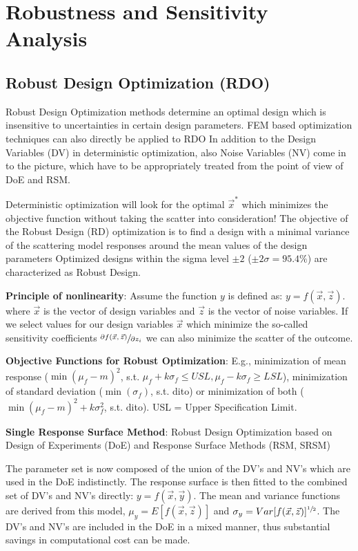 \section*{Robustness and Sensitivity Analysis}

\subsection*{Robust Design Optimization (RDO)}
Robust Design Optimization methods determine an optimal design which is insensitive to uncertainties in certain design parameters.
FEM based optimization techniques can also directly be applied to RDO
In addition to the Design Variables (DV) in deterministic optimization, also Noise Variables (NV) come in to the picture, which have to be appropriately treated from the point of view of DoE and RSM.

Deterministic optimization will look for the optimal $\vec{x}^*$ which minimizes the objective function without taking the scatter into consideration!
The objective of the Robust Design (RD) optimization is to find a design with a minimal variance of the scattering model responses around the mean values of the design parameters
Optimized designs within the sigma level $\pm 2$ ($\pm 2\sigma = 95.4\%$) are characterized as Robust Design.

\textbf{Principle of nonlinearity}:
Assume the function $y$ is defined as: $y=f(\vec{x}, \vec{z})$. where $\vec{x}$ is the vector of design variables and $\vec{z}$ is the vector of noise variables. 
If we select values for our design variables $\vec{x}$ which minimize the so-called sensitivity coefficients $\sfrac{\partial f(\vec{x}, \vec{z})}{\partial z_i}$ we can also minimize the scatter of the outcome.

\textbf{Objective Functions for Robust Optimization}:
E.g., minimization of mean response ($\min(\mu_f - m)^2$, s.t. $\mu_f + k\sigma_f \leq USL, \mu_f - k\sigma_f \geq LSL$), minimization of standard deviation ($\min(\sigma_f)$, s.t. dito) or minimization of both ($\min(\mu_f - m)^2 + k \sigma_f^2$, s.t. dito).
USL = Upper Specification Limit.


\textbf{Single Response Surface Method}:
Robust Design Optimization based on Design of Experiments (DoE) and Response Surface Methods (RSM, SRSM)

The parameter set is now composed of the union of the DV’s and NV’s which are used in the DoE indistinctly.
The response surface is then fitted to the combined set of DV’s and NV’s directly: $y=f(\vec{x}, \vec{y})$.
The mean and variance functions are derived from this model, 
$\mu_y = E[f(\vec{x},\vec{z})]$ and $\sigma_y = Var[f(\vec{x},\vec{z})]^{\sfrac{1}{2}}$.
The DV’s and NV’s are included in the DoE in a mixed manner, thus substantial savings in computational cost can be made.